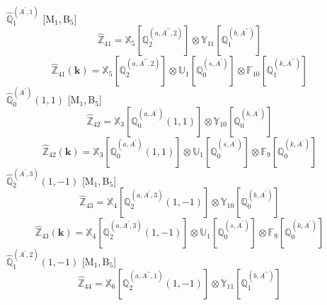 \documentclass[fleqn,10pt,landscape]{article}
\begin{document}
\begin{itemize}
\begin{dmath*}
\end{dmath*}
\vspace{4mm}
\noindent {} $\,\,\,\hat{\mathbb{Q}}_{1}^{(A^{\prime},1)}$ [M$_{1}$,\,B$_{5}$]
\begin{dmath*}
\hat{\mathbb{Z}}_{41}=\mathbb{X}_{5}[\mathbb{Q}_{2}^{(a,A^{\prime\prime},2)}] \otimes\mathbb{Y}_{11}[\mathbb{Q}_{1}^{(b,A^{\prime\prime})}]
\end{dmath*}
\begin{dmath*}
\hat{\mathbb{Z}}_{41}(\bm{k})=\mathbb{X}_{5}[\mathbb{Q}_{2}^{(a,A^{\prime\prime},2)}] \otimes\mathbb{U}_{1}[\mathbb{Q}_{0}^{(s,A^{\prime})}] \otimes\mathbb{F}_{10}[\mathbb{Q}_{1}^{(k,A^{\prime\prime})}]
\end{dmath*}
\vspace{4mm}
\noindent {} $\,\,\,\hat{\mathbb{Q}}_{0}^{(A^{\prime})}(1,1)$ [M$_{1}$,\,B$_{5}$]
\begin{dmath*}
\hat{\mathbb{Z}}_{42}=\mathbb{X}_{3}[\mathbb{Q}_{0}^{(a,A^{\prime})}(1,1)] \otimes\mathbb{Y}_{10}[\mathbb{Q}_{0}^{(b,A^{\prime})}]
\end{dmath*}
\begin{dmath*}
\hat{\mathbb{Z}}_{42}(\bm{k})=\mathbb{X}_{3}[\mathbb{Q}_{0}^{(a,A^{\prime})}(1,1)] \otimes\mathbb{U}_{1}[\mathbb{Q}_{0}^{(s,A^{\prime})}] \otimes\mathbb{F}_{9}[\mathbb{Q}_{0}^{(k,A^{\prime})}]
\end{dmath*}
\vspace{4mm}
\noindent {} $\,\,\,\hat{\mathbb{Q}}_{2}^{(A^{\prime},3)}(1,-1)$ [M$_{1}$,\,B$_{5}$]
\begin{dmath*}
\hat{\mathbb{Z}}_{43}=\mathbb{X}_{4}[\mathbb{Q}_{2}^{(a,A^{\prime},3)}(1,-1)] \otimes\mathbb{Y}_{10}[\mathbb{Q}_{0}^{(b,A^{\prime})}]
\end{dmath*}
\begin{dmath*}
\hat{\mathbb{Z}}_{43}(\bm{k})=\mathbb{X}_{4}[\mathbb{Q}_{2}^{(a,A^{\prime},3)}(1,-1)] \otimes\mathbb{U}_{1}[\mathbb{Q}_{0}^{(s,A^{\prime})}] \otimes\mathbb{F}_{9}[\mathbb{Q}_{0}^{(k,A^{\prime})}]
\end{dmath*}
\vspace{4mm}
\noindent {} $\,\,\,\hat{\mathbb{Q}}_{1}^{(A^{\prime},2)}(1,-1)$ [M$_{1}$,\,B$_{5}$]
\begin{dmath*}
\hat{\mathbb{Z}}_{44}=\mathbb{X}_{6}[\mathbb{Q}_{2}^{(a,A^{\prime\prime},1)}(1,-1)] \otimes\mathbb{Y}_{11}[\mathbb{Q}_{1}^{(b,A^{\prime\prime})}]
\end{dmath*}
\begin{dmath*}

\end{dmath*}
\end{itemize}
\end{document}
